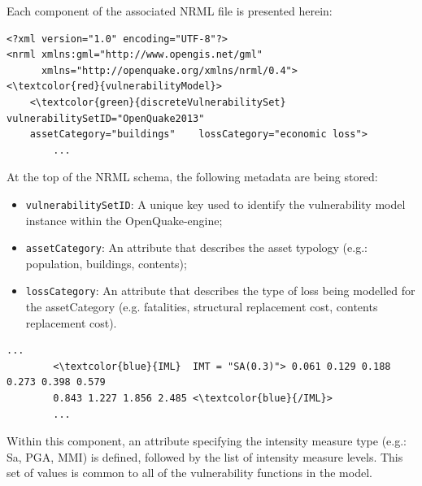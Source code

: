 Each component of the associated NRML file is presented herein:

\begin{Verbatim}[frame=single, commandchars=\\\{\}, samepage=true]
<?xml version="1.0" encoding="UTF-8"?>
<nrml xmlns:gml="http://www.opengis.net/gml"
      xmlns="http://openquake.org/xmlns/nrml/0.4">
<\textcolor{red}{vulnerabilityModel}>
    <\textcolor{green}{discreteVulnerabilitySet} vulnerabilitySetID="OpenQuake2013"	
    assetCategory="buildings"    lossCategory="economic loss">
        ...
\end{Verbatim}

At the top of the NRML schema, the following metadata are being stored:
\begin{itemize}
\item  \Verb+vulnerabilitySetID+: A unique key used to identify the \gls{vulnerability model} instance within the OpenQuake-engine;
\item  \Verb+assetCategory+: An attribute that describes the asset typology (e.g.: population, buildings, contents);
\item  \Verb+lossCategory+: An attribute that describes the type of loss being modelled for the assetCategory (e.g. fatalities, structural replacement cost, contents replacement cost).
\end{itemize}

\begin{Verbatim}[frame=single, commandchars=\\\{\}, samepage=true]
    ...
        <\textcolor{blue}{IML}  IMT = "SA(0.3)"> 0.061 0.129 0.188 0.273 0.398 0.579 
        0.843 1.227 1.856 2.485 <\textcolor{blue}{/IML}>
        ...
\end{Verbatim}

Within this component, an attribute specifying the intensity measure type (e.g.: Sa, PGA, MMI) is defined, followed by the list of intensity measure levels. This set of values is common to all of the \glspl{vulnerability function} in the model.

